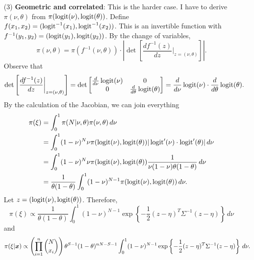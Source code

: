 {{\begin{enumerate}
    \item[(3)]  {\bf Geometric and correlated}: This is the harder case. I
    have to derive $\pi(\nu,\theta)$ from $\pi(\operatorname{logit}(\nu), \operatorname{logit}(\theta))$.
    Define $f(x_1,x_2) = (\operatorname{logit}^{-1}(x_1), \operatorname{logit}^{-1}(x_2))$. This is an
    invertible function with $f^{-1}(y_1,y_2) = (\operatorname{logit}(y_1), \operatorname{logit}(y_2))$. By
    the change of variables, 
    $$
    \pi(\nu,\theta) = \pi(f^{-1}(\nu, \theta))\cdot\left|\det \left[\frac{df^{-1}(z)}{dz}\bigg|_{z=(\nu,\theta)}\right]\right|.
    $$
    Observe that 
    $$
    \det \left[\frac{df^{-1}(z)}{dz}\bigg|_{z=(\nu,\theta)}\right] = \det \begin{bmatrix}
        \frac{d}{d\nu}\operatorname{logit}(\nu) & 0 \\
        0 & \frac{d}{d\theta}\operatorname{logit}(\theta)
    \end{bmatrix} = \frac{d}{d\nu}\operatorname{logit}(\nu) \cdot \frac{d}{d\theta}\operatorname{logit}(\theta).
    $$
    By the calculation of the Jacobian, we can join everything
    \begin{equation*}
        \begin{split}
            \pi(\xi) &= \int_0^{1} \pi(N|\nu,\theta)\pi(\nu,\theta) \, d\nu  \\
            &= \int_0^1 (1-\nu)^N\nu \pi(\operatorname{logit}(\nu), \operatorname{logit}(\theta))|\operatorname{logit} '(\nu) \cdot \operatorname{logit} '(\theta)| \, d\nu \\
            &= \int_0^1 (1-\nu)^N\nu \pi(\operatorname{logit}(\nu), \operatorname{logit}(\theta))\frac{1}{\nu(1-\nu)\theta(1-\theta)}\, d\nu \\ 
            &= \frac{1}{\theta(1-\theta)}\int_0^1 (1-\nu)^{N-1}\pi(\operatorname{logit}(\nu), \operatorname{logit}(\theta)) \, d\nu . \\
        \end{split}
    \end{equation*} 
    Let $z = (\operatorname{logit}(\nu), \operatorname{logit}(\theta))$. Therefore, 
    \begin{equation}
        \label{eq:prior-geom-corr}
        \pi(\xi) \propto \frac{1}{\theta(1-\theta)}\int_0^1 (1-\nu)^{N-1}\exp\left\{-\frac{1}{2}(z - \eta)^T\Sigma^{-1}(z-\eta)\right\} \, d\nu
    \end{equation}
    and 
    \begin{equation}
        \label{eq:posterior-geom-corr}
        \pi(\xi|\boldsymbol{x}) \propto \left(\prod_{i=1}^n \binom{N}{x_i}\right)\theta^{S-1}(1 - \theta)^{nN - S-1}\int_0^1 (1-\nu)^{N-1}\exp\left\{-\frac{1}{2}(z - \eta)^T\Sigma^{-1}(z-\eta)\right\} \, d\nu.
    \end{equation}

\end{enumerate}

}}


\vspace{2ex}